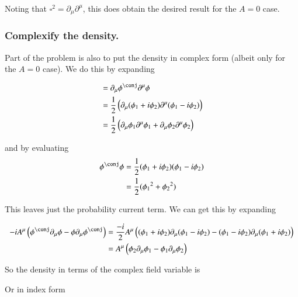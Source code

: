 \documentclass{article}
\begin{document}
Noting that $\square^2 = \partial_\mu \partial^\mu$, this does obtain the desired result for the $A=0$ case.

\subsubsection{ Complexify the density. }

Part of the problem is also to put the density in complex form (albeit only for the $A=0$ case).  We do this by expanding

\begin{align*}
&= \partial_\mu \phi^\conj \partial^\mu \phi \\
&=
\inv{2} \left( \partial_\mu (\phi_1 + i \phi_2) \partial^\mu (\phi_1 - i \phi_2) \right) \\
&=
\inv{2} \left( \partial_\mu \phi_1 \partial^\mu \phi_1 + \partial_\mu \phi_2 \partial^\mu \phi_2 \right) \\
\end{align*}

and by evaluating
\begin{align*}
\phi^\conj \phi 
&= \inv{2} (\phi_1 + i \phi_2) (\phi_1 - i \phi_2) \\
&= \inv{2} ({\phi_1}^2 + {\phi_2}^2 )
\end{align*}

This leaves just the probability current term.  We can get this by expanding

\begin{align*}
- i A^\mu \left( \phi^\conj \partial_\mu \phi - \phi \partial_\mu \phi^\conj \right)
&=
\frac{-i}{2} A^\mu \left( (\phi_1 + i \phi_2) \partial_\mu (\phi_1 - i \phi_2) - (\phi_1 - i \phi_2) \partial_\mu (\phi_1 + i \phi_2) \right) \\
&=
A^\mu \left( \phi_2 \partial_\mu \phi_1 - \phi_1 \partial_\mu \phi_2 \right)
\end{align*}


So the density in terms of the complex field variable is 

%
Or in index form
\end{document}
